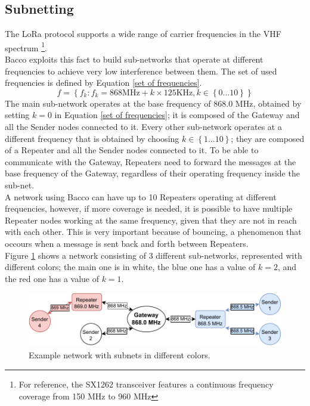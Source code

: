 \subsection{Subnetting}
The LoRa protocol supports a wide range of carrier frequencies in the \gls{VHF} spectrum \footnote{For reference, the
SX1262\cite{sx1262} transceiver features a continuous frequency coverage from 150 MHz to 960 MHz}.\\
Bacco exploits this fact to build sub-networks that operate at different frequencies to achieve very low
interference between them. The set of used frequencies is defined by Equation \ref{set of frequencies}.
\begin{equation}[h]
    \label{set of frequencies}
    f = \left\{ f_k : f_k = 868\text{MHz} + k \times 125\text{KHz}, k\in \left\{0...10 \right\} \right\}
\end{equation}
The main sub-network operates at the base frequency of 868.0 MHz, obtained by setting $k=0$ in Equation \ref{set of
frequencies}; it is composed of the Gateway and all the
Sender nodes connected to it. Every other sub-network operates at a different frequency that is obtained by choosing $k
\in \left\{1...10 \right\}$; they are composed of a Repeater and all the Sender nodes connected to it.
To be able to communicate with the Gateway, Repeaters need to forward the messages at the base frequency of the Gateway,
regardless of their operating frequency inside the sub-net.\\
A network using Bacco can have up to 10 Repeaters operating at different frequencies, however, if more coverage
is needed, it is possible to have multiple Repeater nodes working at the same frequency, given that they are not in
reach with each other. This is very important because of bouncing, a phenomenon that occours when a message is sent
back and forth between Repeaters.\\
Figure \ref{repeaters subnet} shows a network consisting of 3 different sub-networks, represented with different colors;
the main one is in white, the blue one has a value of $k=2$, and the red one has a value of $k=1$.


\begin{figure}[ht]
    \centering
    \includegraphics[width=\linewidth]{uml/repeaters_subnet.pdf}
    \caption{Example network with subnets in different colors.}
    \label{repeaters subnet}
\end{figure}


